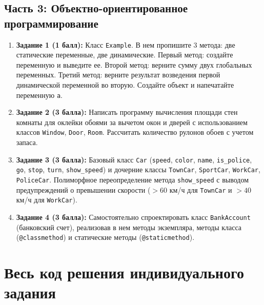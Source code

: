 \documentclass[14pt,a4paper]{extarticle}
\begin{document}
\subsection{Часть 3: Объектно-ориентированное программирование}
\begin{enumerate}
    \item \textbf{Задание 1 (1 балл):} Класс \texttt{Example}. В нем пропишите 3 метода: две статические переменные, две динамические. Первый метод: создайте переменную и выведите ее. Второй метод: верните сумму двух глобальных переменных. Третий метод: верните результат возведения первой динамической переменной во вторую. Создайте объект и напечатайте переменную \texttt{a}.
    \item \textbf{Задание 2 (3 балла):} Написать программу вычисления площади стен комнаты для оклейки обоями за вычетом окон и дверей с использованием классов \texttt{Window}, \texttt{Door}, \texttt{Room}. Рассчитать количество рулонов обоев с учетом запаса.
    \item \textbf{Задание 3 (3 балла):} Базовый класс \texttt{Car} (\texttt{speed}, \texttt{color}, \texttt{name}, \texttt{is\_police}, \texttt{go}, \texttt{stop}, \texttt{turn}, \texttt{show\_speed}) и дочерние классы \texttt{TownCar}, \texttt{SportCar}, \texttt{WorkCar}, \texttt{PoliceCar}. Полиморфное переопределение метода \texttt{show\_speed} с выводом предупреждений о превышении скорости ($>60$ км/ч для \texttt{TownCar} и $>40$ км/ч для \texttt{WorkCar}).
    \item \textbf{Задание 4 (3 балла):} Самостоятельно спроектировать класс \texttt{BankAccount} (банковский счет), реализовав в нем методы экземпляра, методы класса (\texttt{@classmethod}) и статические методы (\texttt{@staticmethod}).
\end{enumerate}

\clearpage
\section{Весь код решения индивидуального задания}
\end{document}
